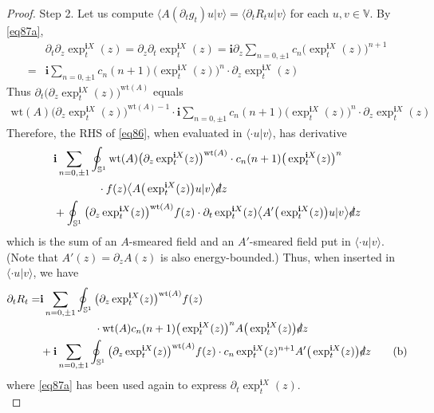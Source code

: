 \documentclass[12pt,b5paper,notitlepage]{article}
\theoremstyle{definition}
\theoremstyle{plain}
\newcommand{\bk}[1]{\langle {#1}\rangle}
\newcommand{\bigbk}[1]{\big\langle {#1}\big\rangle}
\newcommand{\im}{\mathbf{i}}
\newcommand{\Vbb}{\mathbb V}
\newcommand{\wt}{\mathrm{wt}}
\newcommand{\Sbb}{{\mathbb S}}
\newcommand{\ointn}{\oint\nolimits}
\newcommand{\sd}{\slashed{d}}
\numberwithin{equation}{section}
\begin{document}
\begin{proof}
Step 2. Let us compute $\bk{A(\partial_tg_t)u|v}=\bk{\partial_tR_tu|v}$ for each $u,v\in\Vbb$. By \eqref{eq87a}, 
\begin{align*}
&\partial_t\partial_z\exp^{\im X}_t(z)=\partial_z\partial_t\exp^{\im X}_t(z)=\im\partial_z\sum_{n=0,\pm1} c_n \big(\exp^{\im X}_t(z)\big)^{n+1}\\
=&\im\sum_{n=0,\pm1} c_n (n+1)\big(\exp^{\im X}_t(z)\big)^n\cdot\partial_z\exp^{\im X}_t(z)
\end{align*}
Thus $\partial_t\big(\partial_z\exp^{\im X}_t(z)\big)^{\wt(A)}$ equals
\begin{align*}
\wt(A)\big(\partial_z\exp^{\im X}_t(z)\big)^{\wt(A)-1}\cdot \im\sum_{n=0,\pm1} c_n (n+1)\big(\exp^{\im X}_t(z)\big)^n\cdot\partial_z\exp^{\im X}_t(z)
\end{align*}
Therefore, the RHS of \eqref{eq86}, when evaluated in $\bk{\cdot u|v}$, has derivative
\begin{align*}
&\im \sum_{n=0,\pm1}\ointn_{\Sbb^1}\wt(A)\big(\partial_z\exp^{\im X}_t(z)\big)^{\wt(A)}\cdot c_n (n+1)\big(\exp^{\im X}_t(z)\big)^n\\
&\qquad\qquad\cdot f(z)\bigbk{A\big(\exp^{\im X}_t(z)\big)u|v}\sd z\\
&+\ointn_{\Sbb^1} \big(\partial_z\exp^{\im X}_t(z)\big)^{\wt(A)}f(z)\cdot \partial_t\exp^{\im X}_t(z) \bigbk{A'\big(\exp^{\im X}_t(z)\big)u|v}\sd z
\end{align*}
which is the sum of an $A$-smeared field and an $A'$-smeared field put in $\bk{\cdot u|v}$. (Note that $A'(z)=\partial_zA(z)$ is also energy-bounded.) Thus, when inserted in $\bk{\cdot u|v}$, we have
\begin{align*}
\partial_tR_t=&\im \sum_{n=0,\pm1}\ointn_{\Sbb^1}\big(\partial_z\exp^{\im X}_t(z)\big)^{\wt(A)}f(z)\\
&\qquad\qquad\quad \cdot\wt(A) c_n (n+1)\big(\exp^{\im X}_t(z)\big)^n A\big(\exp^{\im X}_t(z)\big)\sd z\\
&+\im \sum_{n=0,\pm1}\ointn_{\Sbb^1} \big(\partial_z\exp^{\im X}_t(z)\big)^{\wt(A)}f(z)\cdot c_n \exp^{\im X}_t(z)^{n+1} A'\big(\exp^{\im X}_t(z)\big)\sd z  \tag{b}\label{eq133}
\end{align*} 
where \eqref{eq87a} has been used again to express $\partial_t\exp_t^{\im X}(z)$.\\[-1ex]


\end{proof}
\end{document}
